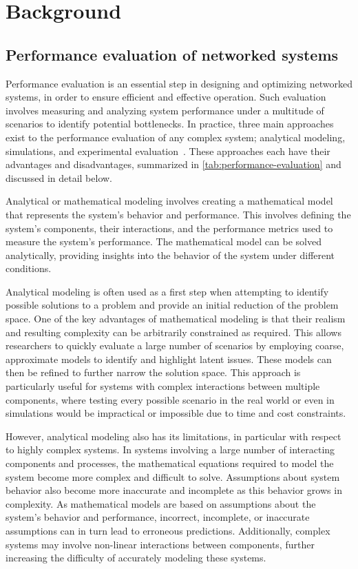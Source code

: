 \section{Background}
\glsresetall%

\subsection{Performance evaluation of networked systems}

Performance evaluation is an essential step in designing and optimizing networked systems, in order to ensure efficient and effective operation.
Such evaluation involves measuring and analyzing system performance under a multitude of scenarios to identify potential bottlenecks.
In practice, three main approaches exist to the performance evaluation of any complex system; analytical modeling, simulations, and experimental evaluation~\cite{fernandes2017performance}.
These approaches each have their advantages and disadvantages, summarized in \cref{tab:performance-evaluation} and discussed in detail below.



Analytical or mathematical modeling involves creating a mathematical model that represents the system's behavior and performance.
This involves defining the system's components, their interactions, and the performance metrics used to measure the system's performance.
The mathematical model can be solved analytically, providing insights into the behavior of the system under different conditions.

Analytical modeling is often used as a first step when attempting to identify possible solutions to a problem and provide an initial reduction of the problem space.
One of the key advantages of mathematical modeling is that their realism and resulting complexity can be arbitrarily constrained as required.
This allows researchers to quickly evaluate a large number of scenarios by employing coarse, approximate models to identify and highlight latent issues.
These models can then be refined to further narrow the solution space.
This approach is particularly useful for systems with complex interactions between multiple components, where testing every possible scenario in the real world or even in simulations would be impractical or impossible due to time and cost constraints.

However, analytical modeling also has its limitations, in particular with respect to highly complex systems.
In systems involving a large number of interacting components and processes, the mathematical equations required to model the system become more complex and difficult to solve.
Assumptions about system behavior also become more inaccurate and incomplete as this behavior grows in complexity.
As mathematical models are based on assumptions about the system's behavior and performance, incorrect, incomplete, or inaccurate assumptions can in turn lead to erroneous predictions.
Additionally, complex systems may involve non-linear interactions between components, further increasing the difficulty of accurately modeling these systems.

